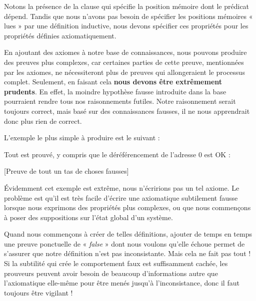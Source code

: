 

Notons la présence de la clause  qui spécifie la
position mémoire dont le
prédicat dépend. Tandis que nous n'avons pas besoin de spécifier les positions
mémoires « lues » par une définition inductive, nous devons spécifier ces propriétés
pour les propriétés définies axiomatiquement.




En ajoutant des axiomes à notre base de connaissances, nous pouvons produire des
preuves plus complexes, car certaines parties de cette preuve, mentionnées par
les axiomes, ne nécessiteront plus de preuves qui allongeraient le processus
complet. Seulement, en faisant cela \textbf{nous devons être extrêmement prudents}.
En effet, la moindre hypothèse fausse introduite dans la base pourraient rendre
tous nos raisonnements futiles. Notre raisonnement serait toujours correct, mais
basé sur des connaissances fausses, il ne nous apprendrait donc plus rien de correct.



L'exemple le plus simple à produire est le suivant :






Tout est prouvé, y compris que le déréférencement de l'adresse 0 est OK :



[Preuve de tout un tas de choses fausses]


Évidemment cet exemple est extrême, nous n'écririons pas un tel axiome. Le
problème est qu'il est très facile d'écrire une axiomatique subtilement fausse
lorsque nous exprimons des propriétés plus complexes, ou que nous commençons à
poser des suppositions sur l'état global d'un système.



Quand nous commençons à créer de telles définitions, ajouter de temps en
temps une preuve ponctuelle de « \textit{false} » dont nous voulons qu'elle échoue permet
de s'assurer que notre définition n'est pas inconsistante. Mais cela ne fait pas
tout ! Si la subtilité qui crée le comportement faux est suffisamment cachée, les
prouveurs peuvent avoir besoin de beaucoup d'informations autre que l'axiomatique
elle-même pour être menés jusqu'à l'inconsistance, donc il faut toujours être
vigilant !




